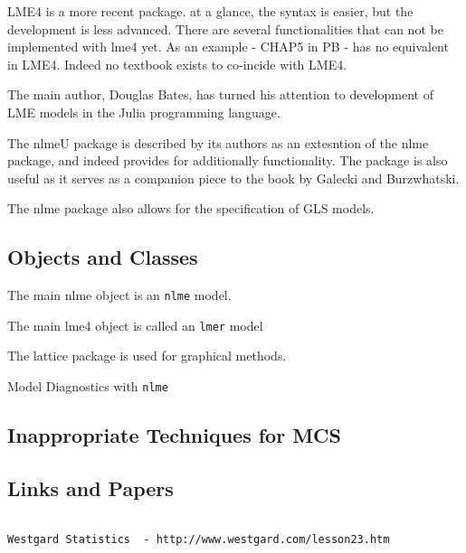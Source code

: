 \documentclass[12pt, a4paper]{report}
\begin{document}
LME4 is a more recent package. at a glance, the syntax is easier, but the development is less advanced. There are several functionalities that can not be implemented with lme4 yet. 
As an example - CHAP5 in PB - has no equivalent in LME4. Indeed no textbook exists to co-incide with LME4.

The main author, Douglas Bates, has turned his attention to development of LME models in the Julia programming language.

The nlmeU package is described by its authors as an extesntion of the nlme package, and indeed provides for additionally functionality. The package is also useful as it serves as a companion piece to the 
book by Galecki and Burzwhatski.

The nlme package also allows for the specification of GLS models.

\subsection*{Objects and Classes}

The main nlme object is an \texttt{nlme} model.

The main lme4 object is called an \texttt{lmer} model

The lattice package is used for graphical methods.


Model Diagnostics with \texttt{nlme}





\subsection{Inappropriate Techniques for MCS}


\subsection{Links and Papers}
\begin{verbatim}

Westgard Statistics  - http://www.westgard.com/lesson23.htm
\end{verbatim}





\end{document}

